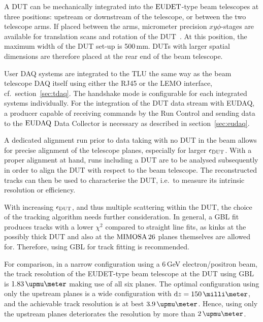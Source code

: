 A DUT can be mechanically integrated into the $\textrm{EUDET}$-type beam telescopes at three positions: upstream or downstream of the telescope, or between the two telescope arms.
If placed between the arms, micrometer precision $xy\phi$-stages are available for translation scans and rotation of the DUT~\cite{Mimosa-twiki}.
At this position, the maximum width of the DUT set-up is 500\,mm.
DUTs with larger spatial dimensions are therefore placed at the rear end of the beam telescope. 

User DAQ systems are integrated to the TLU the same way as the beam telescope DAQ itself using either the RJ45 or the LEMO interface, cf.~section~\ref{sec:tdaq}.
The handshake mode is configurable for each integrated systems individually. 
For the integration of the DUT data stream with EUDAQ, a producer capable of receiving commands by the Run Control and sending data to the $\textrm{EUDAQ}$ Data Collector is necessary
 as described in section~\ref{sec:eudaq}.

A dedicated alignment run prior to data taking with no DUT in the beam allows for precise alignment of the telescope planes, especially for larger $\mathnormal{\epsilon_{\textrm{DUT}}}$. 
With a proper alignment at hand, runs including a DUT are to be analysed subsequently in order to align the DUT with respect to the beam telescope. 
The reconstructed tracks can then be used to characterise the DUT, i.e.~to measure its intrinsic resolution or efficiency. 

With increasing $\mathnormal{\epsilon_{\textrm{DUT}}}$, and thus multiple scattering within the DUT, the choice of the tracking algorithm needs further consideration. 
In general, a GBL fit produces tracks with a lower $\chi^2$ compared to straight line fits,
 as kinks at the possibly thick DUT and also at the $\textrm{MIMOSA\,26}$ planes themselves are allowed for.
Therefore, using GBL for track fitting is recommended. 

For comparison, in a narrow configuration using a 6\,GeV electron/positron beam,
 the track resolution of the EUDET-type beam telescope at the DUT using GBL is $1.83\,\upmu\meter$ making use of all six planes. 
The optimal configuration using only the upstream planes is a wide configuration with $\dz = 150\,\milli\meter$,
 and the achievable track resolution is at best $3.9\,\upmu\meter$. 
Hence, using only the upstream planes deteriorates the resolution by more than $2\,\upmu\meter$.
